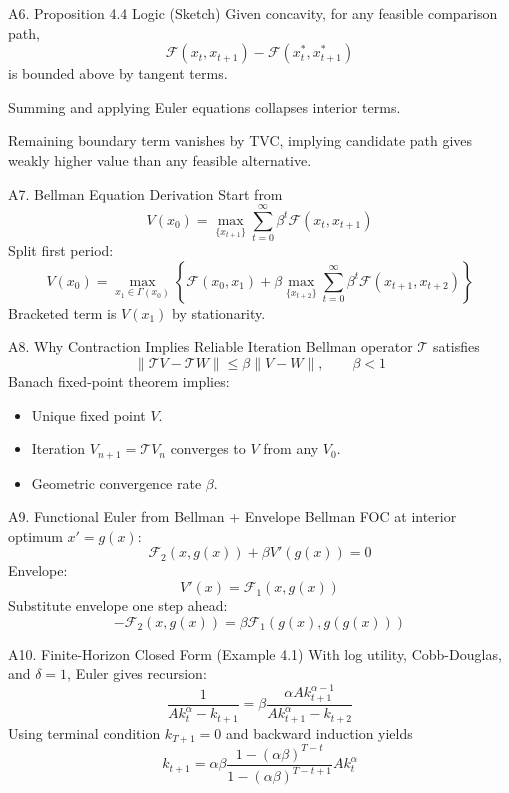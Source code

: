 \documentclass[aspectratio=169,10pt]{beamer}
\newcommand{\backbutton}[1]{\hfill\hyperlink{#1}{\beamerbutton{Back}}}
\begin{document}
\begin{frame}{A6. Proposition 4.4 Logic (Sketch)}
\hypertarget{a6}{}
Given concavity, for any feasible comparison path,
\[
\mathcal{F}(x_t,x_{t+1})-\mathcal{F}(x_t^*,x_{t+1}^*)
\]
is bounded above by tangent terms.

\medskip
Summing and applying Euler equations collapses interior terms.

\medskip
Remaining boundary term vanishes by TVC, implying candidate path gives weakly higher value than any feasible alternative.
\backbutton{m-a6}
\end{frame}

\begin{frame}{A7. Bellman Equation Derivation}
\hypertarget{a7}{}
Start from
\[
V(x_0)=\max_{\{x_{t+1}\}}\sum_{t=0}^{\infty}\beta^t\mathcal{F}(x_t,x_{t+1})
\]
Split first period:
\[
V(x_0)=\max_{x_1\in\Gamma(x_0)}\left\{\mathcal{F}(x_0,x_1)+\beta
\max_{\{x_{t+2}\}}\sum_{t=0}^{\infty}\beta^t\mathcal{F}(x_{t+1},x_{t+2})\right\}
\]
Bracketed term is $V(x_1)$ by stationarity.
\backbutton{m-a7}
\end{frame}

\begin{frame}{A8. Why Contraction Implies Reliable Iteration}
\hypertarget{a8}{}
Bellman operator $\mathcal{T}$ satisfies
\[
\|\mathcal{T}V-\mathcal{T}W\|\le\beta\|V-W\|,\qquad \beta<1
\]
Banach fixed-point theorem implies:
\begin{itemize}
  \item Unique fixed point $V$.
  \item Iteration $V_{n+1}=\mathcal{T}V_n$ converges to $V$ from any $V_0$.
  \item Geometric convergence rate $\beta$.
\end{itemize}
\backbutton{m-a8}
\end{frame}

\begin{frame}{A9. Functional Euler from Bellman + Envelope}
\hypertarget{a9}{}
Bellman FOC at interior optimum $x'=g(x)$:
\[
\mathcal{F}_2(x,g(x))+\beta V'(g(x))=0
\]
Envelope:
\[
V'(x)=\mathcal{F}_1(x,g(x))
\]
Substitute envelope one step ahead:
\[
-\mathcal{F}_2(x,g(x))=\beta\mathcal{F}_1(g(x),g(g(x)))
\]
\backbutton{m-a9}
\end{frame}

\begin{frame}{A10. Finite-Horizon Closed Form (Example 4.1)}
With log utility, Cobb-Douglas, and $\delta=1$, Euler gives recursion:
\[
\frac{1}{Ak_t^\alpha-k_{t+1}}=\beta\frac{\alpha A k_{t+1}^{\alpha-1}}{Ak_{t+1}^\alpha-k_{t+2}}
\]
Using terminal condition $k_{T+1}=0$ and backward induction yields
\[
k_{t+1}=\alpha\beta\frac{1-(\alpha\beta)^{T-t}}{1-(\alpha\beta)^{T-t+1}}Ak_t^{\alpha}
\]
\backbutton{m-a3}
\end{frame}
\end{document}
